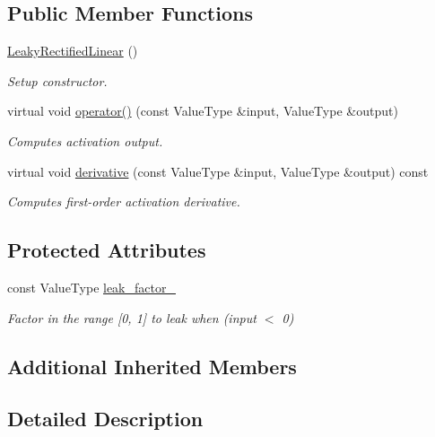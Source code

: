 \subsection*{Public Member Functions}
\begin{DoxyCompactItemize}
\item 
\hyperlink{classffnn_1_1neuron_1_1_leaky_rectified_linear_aedaef89cf5a9390b4ec610d1e7157bf8}{Leaky\-Rectified\-Linear} ()
\begin{DoxyCompactList}\small\item\em Setup constructor. \end{DoxyCompactList}\item 
virtual void \hyperlink{classffnn_1_1neuron_1_1_leaky_rectified_linear_a219673d306064ae1405dd9385f031380}{operator()} (const Value\-Type \&input, Value\-Type \&output)
\begin{DoxyCompactList}\small\item\em Computes activation output. \end{DoxyCompactList}\item 
virtual void \hyperlink{classffnn_1_1neuron_1_1_leaky_rectified_linear_a1bb98dd03e854a69a7ba76b347ec4340}{derivative} (const Value\-Type \&input, Value\-Type \&output) const 
\begin{DoxyCompactList}\small\item\em Computes first-\/order activation derivative. \end{DoxyCompactList}\end{DoxyCompactItemize}
\subsection*{Protected Attributes}
\begin{DoxyCompactItemize}
\item 
const Value\-Type \hyperlink{classffnn_1_1neuron_1_1_leaky_rectified_linear_ab205c35e3123e8965efe63cd665020cb}{leak\-\_\-factor\-\_\-}
\begin{DoxyCompactList}\small\item\em Factor in the range \mbox{[}0, 1\mbox{]} to leak when (input $<$ 0) \end{DoxyCompactList}\end{DoxyCompactItemize}
\subsection*{Additional Inherited Members}


\subsection{Detailed Description}
